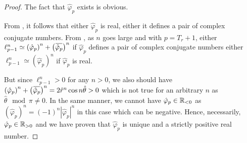 \documentclass{article}
\begin{document}
    \begin{proof}
      The fact that $\hat{\varphi}_p$ exists is obvious.

      From , it follows that either $\hat{\varphi}_p$ is real, either it defines
      a pair of complex conjugate numbers. From , as $n$ goes large and with 
      $p = T_r + 1$, either $\ell^n_{p-1} \simeq \left(\hat{\varphi}_{p}\right)^{n} + \left(\cconj{\hat{\varphi}_p}\right)^n$ if $\hat{\varphi}_p$ 
      defines a pair of complex conjugate numbers either $\ell^n_{p-1} \simeq \left(\hat{\varphi}_{p}\right)^{n}$ if $\hat{\varphi}_p$ is real.
      
      But since $\ell^n_{p-1} > 0$ for any $n > 0$, we also should have $\left(\hat{\varphi}_{p}\right)^{n} + \left(\cconj{\hat{\varphi}_p}\right)^n = 2 \hat{r}^n \cos{n\hat{\theta}} > 0$ 
      which is not true for an arbitrary $n$ as $\hat{\theta} \mod{\pi} \neq 0$. In the same manner, we cannot have $\hat{\varphi}_{p} \in \mathbb{R}_{<0}$
      as $\left(\hat{\varphi}_{p}\right)^{n} = (-1)^n |\hat{\varphi}_{p}|^n$ in this case which can be negative. 
      Hence, necessarily, $\hat{\varphi}_{p} \in \mathbb{R}_{>0}$ and we have proven that $\hat{\varphi}_p$ is unique and a strictly positive real number.
    \end{proof}


      
      
\end{document}
